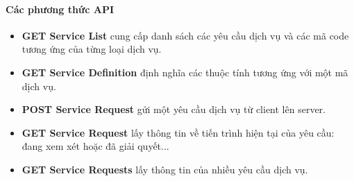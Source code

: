 \documentclass[a4paper]{article}
\begin{document}
\paragraph{Các phương thức API}
\begin{itemize}
	\item \textbf{GET Service List} cung cấp danh sách các yêu cầu dịch vụ và các mã code tương ứng của từng loại dịch vụ.
	\item \textbf{GET Service Definition} định nghĩa các thuộc tính tương ứng với một mã dịch vụ.
	\item \textbf{POST Service Request} gửi một yêu cầu dịch vụ từ client lên server.
	\item \textbf{GET Service Request} lấy thông tin về tiến trình hiện tại của yêu cầu: đang xem xét hoặc đã giải quyết...
	\item \textbf{GET Service Requests} lấy thông tin của nhiều yêu cầu dịch vụ.
\end{itemize}
\end{document}

